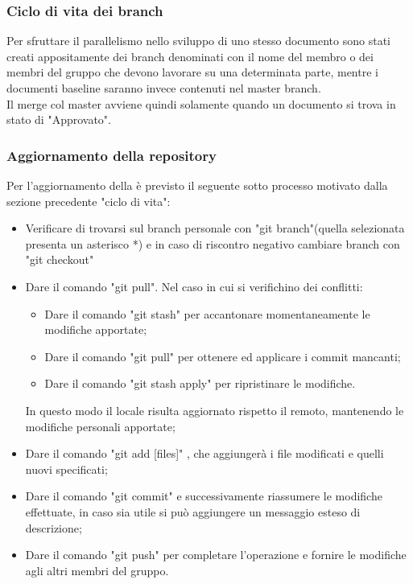 \documentclass[NormeDiProgetto.tex]{subfiles}
\begin{document}
	\subsubsection{Ciclo di vita dei branch}
	Per sfruttare il parallelismo nello sviluppo di uno stesso documento sono stati creati appositamente dei branch denominati con il nome del membro o dei membri del gruppo che devono lavorare su una determinata parte, mentre i documenti baseline saranno invece contenuti nel master branch.\\
	Il merge col master avviene quindi solamente quando un documento si trova in stato di "Approvato".
	
	\subsubsection{Aggiornamento della repository}
	Per l'aggiornamento della  è previsto il seguente sotto processo motivato dalla sezione precedente "ciclo di vita":
	\begin{itemize}
		\item Verificare di trovarsi sul branch personale con "git branch"(quella selezionata presenta un asterisco *) e in caso di riscontro negativo cambiare branch con "git checkout"
		\item Dare il comando "git pull". Nel caso in cui si verifichino dei conflitti:
		\begin{itemize}
			\item Dare il comando "git stash" per accantonare momentaneamente	le modifiche apportate;
			\item Dare il comando "git pull" per ottenere ed applicare i commit mancanti;
			\item Dare il comando "git stash apply" per ripristinare le modifiche.
		\end{itemize}
		In questo modo il  locale risulta aggiornato rispetto il  remoto, mantenendo le modifiche personali apportate;
	
		\item Dare il comando "git add [files]" , che aggiungerà i file modificati e quelli nuovi specificati;
		\item Dare il comando "git commit" e successivamente riassumere le modifiche effettuate, in caso sia utile si può aggiungere un messaggio esteso di descrizione;
		\item Dare il comando "git push" per completare l'operazione e fornire le modifiche agli altri membri del gruppo.
	\end{itemize}
	
\end{document}
